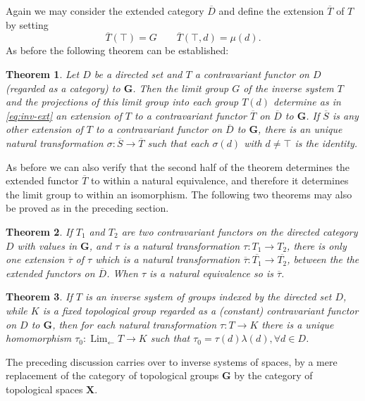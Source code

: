 \documentclass[11pt,a4paper]{report}
\newtheorem{theorem}{Theorem}
\DeclareMathOperator{\Lim}{Lim}
\begin{document}
Again we may consider the extended category $\overline{D}$ and define the extension $\overline{T}$ of $T$ by setting
\begin{equation}\label{eq:inv-ext}
	\overline{T}(\top)=G\qquad \overline{T}(\top,d)=\mu(d).
\end{equation}
As before the following theorem can be established:
\begin{theorem}\label{thm:inv-lim1}
	Let $D$ be a directed set and $T$ a contravariant functor on $D$ (regarded as a category) to $\mathbf{G}$. Then the limit
	group $G$ of the inverse system $T$ and the projections of this limit group into each group $T(d)$ determine as in
	\cref{eq:inv-ext} an extension of $T$ to a contravariant functor $\overline{T}$ on $\overline{D}$ to $\mathbf{G}$. If
	$\overline{S}$ is any other extension of $T$ to a contravariant functor on $\overline{D}$ to $\mathbf{G}$, there is an
	unique natural transformation $\sigma:\overline{S}\rightarrow\overline{T}$ such that each $\sigma(d)$ with $d\ne\top$
	is the identity.
\end{theorem}
As before we can also verify that the second half of the theorem determines the extended functor $\overline{T}$ to within a 
natural equivalence, and therefore it determines the limit group to within an isomorphism.
The following two theorems may also be proved as in the preceding section.
\begin{theorem}\label{thm:inv-uniq1}
	If $T_1$ and $T_2$ are two contravariant functors on the directed category $D$ with values in $\mathbf{G}$, and $\tau$
	is a natural transformation $\tau:T_1\rightarrow T_2$, there is only one extension $\overline{\tau}$ of $\tau$ which is
	a natural transformation $\overline{\tau}:\overline{T_1}\rightarrow \overline{T_2}$, between the the extended functors
	on $\overline{D}$. When $\tau$ is a natural equivalence so is $\overline{\tau}$.
\end{theorem}
\begin{theorem}\label{thm:inv-uniq2}
	If $T$ is an inverse system of groups indexed by the directed set $D$, while $K$ is a fixed topological group regarded
	as a (constant) contravariant functor on $D$ to $\mathbf{G}$, then for each natural transformation $\tau:T\rightarrow K$
	there is a unique homomorphism $\tau_0:\Lim_{\leftarrow} T\rightarrow K$ such that $\tau_0=\tau(d)\lambda(d),\forall d\in D$.
\end{theorem}

The preceding discussion carries over to inverse systems of spaces, by a mere replacement of the category of topological groups
$\mathbf{G}$ by the category of topological spaces $\mathbf{X}$.
\end{document}
